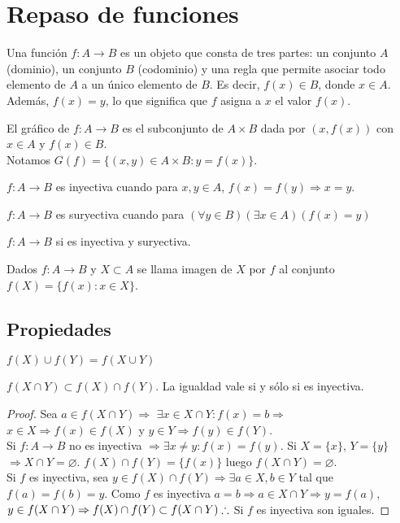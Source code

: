 \section{Repaso de funciones}

Una función $f: A \to B$ es un objeto que consta de tres partes: un conjunto $A$ (dominio), un conjunto $B$ (codominio) y una regla que permite asociar todo elemento de $A$ a un único elemento de $B$. Es decir, $f(x) \in B$, donde $x \in A$.
Además, $f(x) = y$, lo que significa que $f$ asigna a $x$ el valor $f(x)$.

El gráfico de $f: A \to B$ es el subconjunto de $A \times B$ dada por $(x, f(x))$ con $x \in A$ y $f(x) \in B$.\\
Notamos $G(f) = \{ (x, y) \in A \times B : y = f(x) \}$.

\begin{definition}
    $f: A \to B$ es inyectiva cuando para $x, y \in A$, $f(x) = f(y) \Rightarrow x = y$.
\end{definition}

\begin{definition}
    $f: A \to B$ es suryectiva cuando para $(\forall y\in B)(\exists x\in A)(f(x) = y)$
\end{definition}

\begin{definition}
    $f: A \to B$ si es inyectiva y suryectiva.
\end{definition}

\begin{definition}
    Dados $f: A \to B$ y $X \subset A$ se llama imagen de $X$ por $f$ al conjunto $f(X) = \{f(x) : x \in X\}$.
\end{definition}

\subsection{Propiedades}

\begin{prop}
    $f(X) \cup f(Y) = f(X \cup Y)$
\end{prop}

\begin{prop}
    $f(X \cap Y) \subset f(X) \cap f(Y)$. La igualdad vale si y sólo si es inyectiva.
    \begin{proof}
        Sea $a \in f(X \cap Y) \Rightarrow $ $\exists x \in X \cap Y : f(x) = b \Rightarrow$ $ x \in X \Rightarrow f(x) \in f(X) $ y $ y \in Y \Rightarrow f(y) \in f(Y). $ \\ Si $f: A \to B$ no es inyectiva $\Rightarrow \exists x \neq y : f(x) = f(y)$. Si $X = \{x\}$, $Y = \{y\}$ $\Rightarrow X \cap Y = \varnothing$. $f(X) \cap f(Y) = \{f(x)\}$ luego $f(X \cap Y) = \varnothing$. \\ Si $f$ es inyectiva, sea $y \in f(X) \cap f(Y) \Rightarrow \exists a \in X, b \in Y$ tal que $f(a) = f(b) = y$. Como $f$ es inyectiva $a = b \Rightarrow a \in X \cap Y \Rightarrow y = f(a)$, $y \in f(X \cap Y) \Rightarrow f(X) \cap f(Y) \subset f(X \cap Y) \\
            \therefore$ Si $f$ es inyectiva son iguales.
    \end{proof}
\end{prop}


